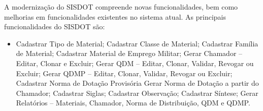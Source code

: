 A modernização do SISDOT compreende novas funcionalidades, bem como melhorias em funcionalidades existentes no sistema atual. As principais funcionalidades do SISDOT são:

\begin{itemize}

\item Cadastrar Tipo de Material;
Cadastrar Classe de Material;
Cadastrar Família de Material;
Cadastrar Material de Emprego Militar;
Gerar Chamador -- Editar, Clonar e Excluir;
Gerar QDM -- Editar, Clonar, Validar, Revogar ou Excluir;
Gerar QDMP --  Editar, Clonar, Validar, Revogar ou Excluir;
Cadastrar Norma de Dotação Provisória
Gerar Norma de Dotação a partir do Chamador;
Cadastrar Siglas;
Cadastrar Observação;
Cadastrar Síntese;
Gerar Relatórios -- Materiais, Chamador, Norma de Distribuição, QDM e QDMP.
\end{itemize}


